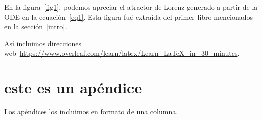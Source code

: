 \documentclass[aps,prl,twocolumn,groupedaddress]{revtex4-2}
\begin{document}
En la figura~\ref{fig1}, podemos apreciar el atractor de Lorenz generado a partir de la ODE en la ecuación~\ref{eq1}.
Esta figura fué extraída del primer libro mencionados en la sección~\ref{intro}.

Así incluimos direcciones web~\url{https://www.overleaf.com/learn/latex/Learn_LaTeX_in_30_minutes}.



\onecolumngrid
\appendix

\section{este es un apéndice}
\label{appA}

Los apéndices los incluimos en formato de una columna.
\end{document}
